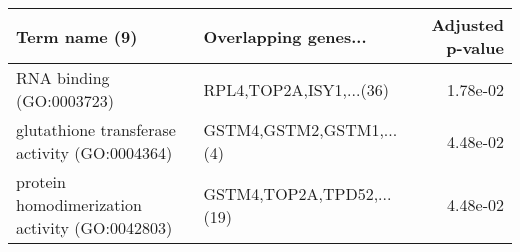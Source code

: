 \begin{tabular}{llr}
\toprule
                                 Term name (9) &      Overlapping genes... &  Adjusted p-value \\
\midrule
                      RNA binding (GO:0003723) &   RPL4,TOP2A,ISY1,...(36) &          1.78e-02 \\
 glutathione transferase activity (GO:0004364) &  GSTM4,GSTM2,GSTM1,...(4) &          4.48e-02 \\
protein homodimerization activity (GO:0042803) & GSTM4,TOP2A,TPD52,...(19) &          4.48e-02 \\
\bottomrule
\end{tabular}
